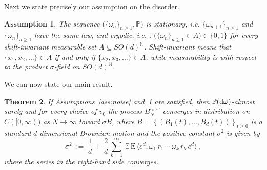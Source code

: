 \documentclass[a4paper,reqno,11pt]{amsart}
\numberwithin{equation}{section}
\newtheorem{theorem}{Theorem}[section]
\newtheorem{assumption}[theorem]{Assumption}
\newcommand{\bbE}{{\ensuremath{\mathbb E}} }
\newcommand{\bbP}{{\ensuremath{\mathbb P}} }
\newcommand{\gs}{\sigma}
\newcommand{\go}{\omega}
\newcommand{\dd}{\text{\rm d}}             %
\newcommand{\N}{\mathbb{N}}
\def\bE{\ensuremath{\bs{\mathrm{E}}}}
\def\bs{\boldsymbol}
\begin{document}
\smallskip

Next we state precisely our assumption on the disorder.

\medskip
\begin{assumption} \rm \label{ass:disorder}
The sequence $\big(\{\go_n\}_{n\ge 1},\bbP\big)$ is {\sl stationary},
{\sl i.e.} $\{\go_{n+1}\}_{n\ge 1} $ and $ \{\go_n\}_{n\ge 1}$ have the same
law, and {\sl ergodic},
{\sl i.e.} $\bbP \big( \{\go_n\}_{n\ge 1} \in A \big) \in \{0,1\}$
for every shift-invariant measurable set $A \subseteq SO(d)^{\N}$.
Shift-invariant means that $\{x_1, x_2, \ldots\} \in A$
if and only if $\{x_2, x_3, \ldots\} \in A$, while measurability is with respect to the
product $\gs$-field on $SO(d)^{\N}$.
\end{assumption}
\medskip

We can now state our main result.

\medskip
\begin{theorem} \label{th:main}
If Assumptions~\ref{ass:noise} and~\ref{ass:disorder} are satisfied,
then $\bbP(\dd \go)$-almost surely and for every choice of $v_0$ the
process $B_{N}^{v_0, \go}$ converges in distribution on $C([0,\infty))$
as $N \to\infty$ toward $\gs B$, where
$B=\left\{ \left(B_1(t), \ldots , B_d(t)\right) \right\}_{t\ge 0}$
is a standard $d$-dimensional Brownian motion and the positive
constant $\sigma^2$ is given by
\begin{equation}
\label{eq:sigma-def}
	\sigma^2 \;:=\; \frac 1 d \,+\, \frac 2 d\, \sum_{k=1}^\infty \,
	\bbE  \, \bE \, \langle e^d ,
	 \go_1 \, r_1 \, \cdots \, \go_k \, r_k  \, e^d \rangle \,,
\end{equation}
where the series in the right-hand side  converges.
\end{theorem}

\medskip
\end{document}
